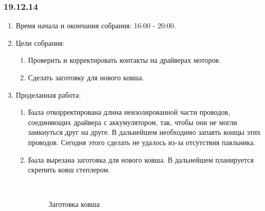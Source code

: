 \subsubsection{19.12.14}
\begin{enumerate}
	\item Время начала и окончания собрания: 16:00 - 20:00.
	\item Цели собрания:
	\begin{enumerate}
		\item Проверить и корректировать контакты на драйверах моторов.
		
		\item Сделать заготовку для нового ковша.
		
	\end{enumerate}
	
	\item Проделанная работа:
	\begin{enumerate}
		\item Была откорректирована длина неизолированной части проводов, соединяющих драйвера с аккумулятором, так, чтобы они не могли замкнуться друг на друге. В дальнейшем необходимо запаять конщы этих проводов. Сегодня этого сделать не удалось из-за отсутствия паяльника.
		
		\item Была вырезана заготовка для нового ковша. В дальнейшем планируется скрепить ковш степлером. 
		
		\begin{figure}[H]
			\begin{minipage}[h]{0.2\linewidth}
				\center  
			\end{minipage}
			\begin{minipage}[h]{0.6\linewidth}
				\caption{Заготовка ковша}
			\end{minipage}
		\end{figure}
		

\end{enumerate}
\end{enumerate}
